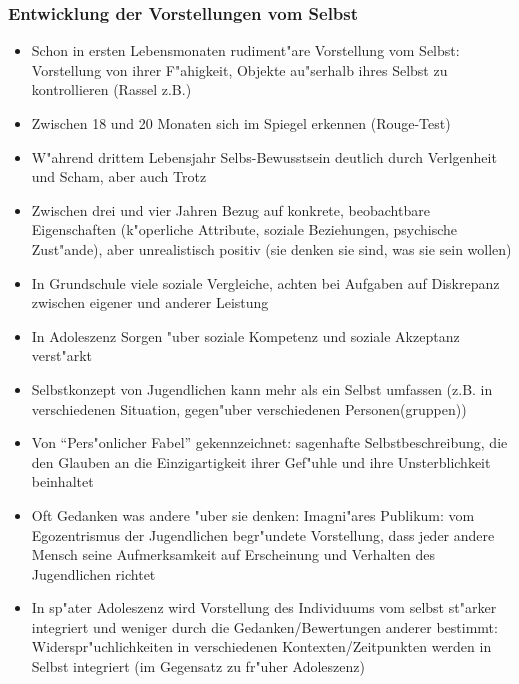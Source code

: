 \subsubsection{Entwicklung der Vorstellungen vom Selbst}
\begin{itemize}
	\item
		Schon in ersten Lebensmonaten rudiment"are Vorstellung vom Selbst: Vorstellung von ihrer F"ahigkeit, Objekte au"serhalb ihres Selbst zu kontrollieren (Rassel z.B.)
	\item
		Zwischen 18 und 20 Monaten sich im Spiegel erkennen (Rouge-Test)
	\item
		W"ahrend drittem Lebensjahr Selbs-Bewusstsein deutlich durch Verlgenheit und Scham, aber auch Trotz
	\item
		Zwischen drei und vier Jahren Bezug auf konkrete, beobachtbare Eigenschaften (k"operliche Attribute, soziale Beziehungen, psychische Zust"ande), aber unrealistisch positiv (sie denken sie sind, was sie sein wollen)
	\item
		In Grundschule viele soziale Vergleiche, achten bei Aufgaben auf Diskrepanz zwischen eigener und anderer Leistung
	\item
		In Adoleszenz Sorgen "uber soziale Kompetenz und soziale Akzeptanz verst"arkt
	\item
		Selbstkonzept von Jugendlichen kann mehr als ein Selbst umfassen (z.B. in verschiedenen Situation, gegen"uber verschiedenen Personen(gruppen))
	\item
		Von \enquote{Pers"onlicher Fabel} gekennzeichnet: sagenhafte Selbstbeschreibung, die den Glauben an die Einzigartigkeit ihrer Gef"uhle und ihre Unsterblichkeit beinhaltet
	\item
		Oft Gedanken was andere "uber sie denken: Imagni"ares Publikum: vom Egozentrismus der Jugendlichen begr"undete Vorstellung, dass jeder andere Mensch seine Aufmerksamkeit auf Erscheinung und Verhalten des Jugendlichen richtet
	\item
		In sp"ater Adoleszenz wird Vorstellung des Individuums vom selbst st"arker integriert und weniger durch die Gedanken/Bewertungen anderer bestimmt: Widerspr"uchlichkeiten in verschiedenen Kontexten/Zeitpunkten werden in Selbst integriert (im Gegensatz zu fr"uher Adoleszenz)
\end{itemize}

